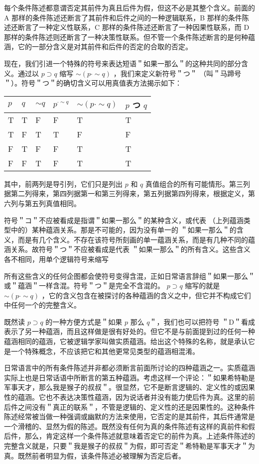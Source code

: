 每个条件陈述都意谓否定其前件为真且后件为假，但这不必是其整个含义。前面的 A 那样的条件陈述还断言了其前件和后件之间的一种逻辑联系，B 那样的条件陈述还断言了一种定义性联系，C 那样的条件陈述还断言了一种因果性联系，而 D 那样的条件陈述则还断言了一种决策性联系。但不管一个条件陈述断言的是何种蕴涵，它的一部分含义是对其前件和后件的否定的合取的否定。

现在，我们引进一个特殊的符号来表达短语＂如果一那么＂的这种共同的部分含义。通过以 $p \supset q$ 缩写 $\sim(p \cdot \sim q)$ ，我们来定义新符号＂つ＂ （叫＂马蹄号＂）。符号＂つ＂的确切含义可以用真值表方法揭示如下：

\begin{center}
\begin{tabular}{|l|l|l|l|l|l|}
\hline
$p$ & $q$ & $\sim q$ & $p^{\cdot \sim q}$ & $\sim(p \cdot \sim q)$ & $p$ つ $q$ \\
\hline
T & T & F & F & T & T \\
\hline
T & F & T & T & F & F \\
\hline
F & T & F & F & T & T \\
\hline
F & F & T & F & T & T \\
\hline
\end{tabular}
\end{center}

其中，前两列是导引列，它们只是列出 $p$ 和 $q$ 真值组合的所有可能情形。第三列据第二列得来，第四列据第一和第三列得来，第五列据第四列得来，根据定义，第六列与第五列真值相同。

符号＂コ＂不应被看成是指谓＂如果一那么＂的某种含义，或代表 （上列蕴涵类型中的）某种蕴涵关系。那是不可能的，因为没有单一的 ＂如果一那么＂的含义，而是有几个含义。不存在该符号所刻画的单一蕴涵关系，而是有几种不同的蕴涵关系。故符号＂つ＂不应被看成是代表 ＂如果一那么＂的所有含义。这些含义各不相同，用单个逻辑符号来缩写

所有这些含义的任何企图都会使符号变得含混，正如日常语言辞组＂如果一那么＂或＂蕴涵＂一样含混。符号＂つ＂是完全不含混的。 $p \supset q$ 缩写的就是 $\sim(p \cdot \sim q)$ ，它的含义包含在被探讨的各种蕴涵的含义之中，但它并不构成它们中任何一个的完整含义。

既然读 $p \supset q$ 的一种方便方式是＂如果 $p$ 那么 $q$＂，我们也可以把符号 ＂D＂看成表示了另一种蕴涵，而且这样做是很有好处的。但它不是与前面提到过的任何一种蕴涵相同的蕴涵，它被逻辑学家叫做实质蕴涵。给出这个特殊的名称，就是承认它是一个特殊概念，不应该把它和其他更常见类型的蕴涵相混淆。

日常语言中的所有条件陈述并非都必须断言前面所讨论的四种蕴涵之一。实质蕴涵实际上也是日常话语中所断言的第五种蕴涵。考虑这样一个评论：＂如果希特勒是军事天才，那么我是猴子的叔叔＂。很显然，它不是断言逻辑的、定义性的或因果性的蕴涵。它也不表达决策性蕴涵，因为说话者并没有能力使后件为真。这里的前后件之间没有＂真正的联系＂，不管是逻辑的、定义性的还是因果性的。这种条件陈述经常被当做一种强调或幽默的方法来使用，它否定的是其前件，其后件通常是一个滑稽的、显然为假的陈述。既然没有任何为真的条件陈述有这样的真前件和假后件，那么，肯定这样一个条件陈述就意味着否定它的前件为真。上述条件陈述的完整含义就是，只要＂我是猴子的叔叔＂为假，即可否定＂希特勒是军事天才＂为真。既然前者明显为假，该条件陈述必被理解为否定后者。

